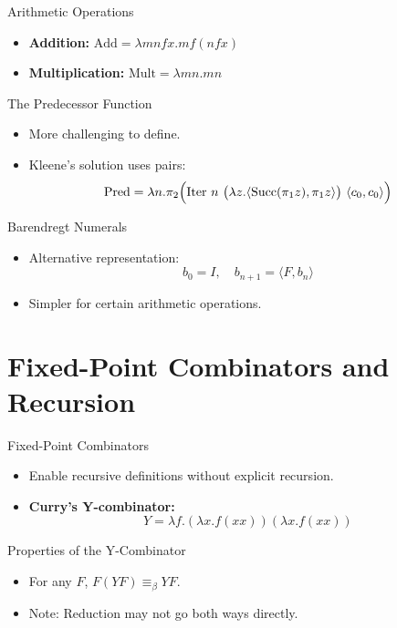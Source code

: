 \documentclass{beamer}
\begin{document}
\begin{frame}{Arithmetic Operations}
  \begin{itemize}
    \item \textbf{Addition:} \( \text{Add} = \lambda m n f x. m f (n f x) \)
    \item \textbf{Multiplication:} \( \text{Mult} = \lambda m n. m n \)
  \end{itemize}
\end{frame}

\begin{frame}{The Predecessor Function}
  \begin{itemize}
    \item More challenging to define.
    \item Kleene’s solution uses pairs:
      \[
      \text{Pred} = \lambda n. \pi_2 \Bigl( \text{Iter}\ n\ \bigl(\lambda z. \langle \text{Succ}(\pi_1 z),\pi_1 z \rangle\bigr)\ \langle c_0, c_0 \rangle \Bigr)
      \]
  \end{itemize}
\end{frame}

\begin{frame}{Barendregt Numerals}
  \begin{itemize}
    \item Alternative representation: 
      \[
      b_0 = I,\quad b_{n+1} = \langle F, b_n \rangle
      \]
    \item Simpler for certain arithmetic operations.
  \end{itemize}
\end{frame}

\section{Fixed-Point Combinators and Recursion}
\begin{frame}{Fixed-Point Combinators}
  \begin{itemize}
    \item Enable recursive definitions without explicit recursion.
    \item \textbf{Curry's Y-combinator:}
      \[
      Y = \lambda f. (\lambda x. f (x x)) (\lambda x. f (x x))
      \]
  \end{itemize}
\end{frame}

\begin{frame}{Properties of the Y-Combinator}
  \begin{itemize}
    \item For any \(F\), \(F (Y F) \equiv_\beta Y F\).
    \item Note: Reduction may not go both ways directly.
  \end{itemize}
\end{frame}
\end{document}
